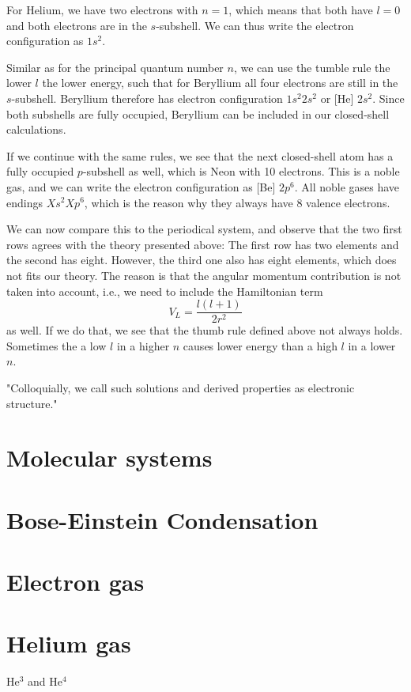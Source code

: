 For Helium, we have two electrons with $n=1$, which means that both have $l=0$ and both electrons are in the $s$-subshell. We can thus write the electron configuration as $1s^2$. 

Similar as for the principal quantum number $n$, we can use the tumble rule the lower $l$ the lower energy, such that for Beryllium all four electrons are still in the $s$-subshell. Beryllium therefore has electron configuration $1s^2 2s^2$ or [He] $2s^2$. Since both subshells are fully occupied, Beryllium can be included in our closed-shell calculations. 

If we continue with the same rules, we see that the next closed-shell atom has a fully occupied $p$-subshell as well, which is Neon with 10 electrons. This is a noble gas, and we can write the electron configuration as [Be] $2p^6$. All noble gases have endings $Xs^2 Xp^6$, which is the reason why they always have 8 valence electrons.

We can now compare this to the periodical system, and observe that the two first rows agrees with the theory presented above: The first row has two elements and the second has eight. However, the third one also has eight elements, which does not fits our theory. The reason is that the angular momentum contribution is not taken into account, i.e., we need to include the Hamiltonian term
\begin{equation}
V_L=\frac{l(l+1)}{2r^2}
\end{equation}
as well. If we do that, we see that the thumb rule defined above not always holds. Sometimes the a low $l$ in a higher $n$ causes lower energy than a high $l$ in a lower $n$. 

"Colloquially, we call such solutions and derived properties as electronic structure."

\section{Molecular systems}

\section{Bose-Einstein Condensation}

\section{Electron gas} \label{subsubsec:electrongas}
\section{Helium gas} \label{subsubsec:heliumgas}
He$^3$ and He$^4$